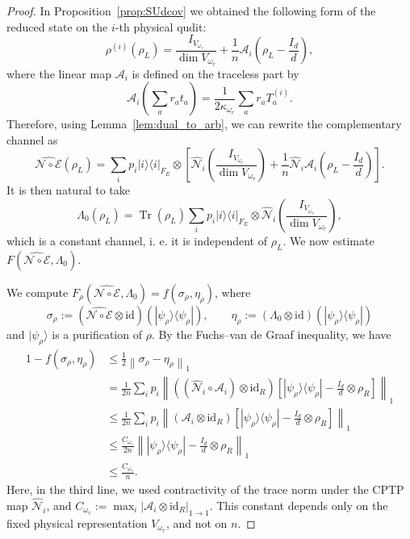 \documentclass[11pt,letterpaper]{article}
\theoremstyle{plain}
\theoremstyle{plain}
\theoremstyle{plain}
\theoremstyle{plain}
\theoremstyle{plain}
\theoremstyle{plain}
\theoremstyle{plain}
\theoremstyle{definition}
\theoremstyle{plain}
\begin{document}
\begin{proof}
In Proposition~\ref{prop:SUdcov} we obtained the following form of the reduced state on the \(i\)-th physical qudit:
\[
\rho^{(i)}(\rho_L)
=
\frac{I_{V_{\omega_r}}}{\dim V_{\omega_r}}
+
\frac{1}{n}\mathcal A_i\left(\rho_L-\frac{I_d}{d}\right),
\]
where the linear map \(\mathcal A_i\) is defined on the traceless part by
\[
\mathcal A_i\left(\sum_a r_a t_a\right)
=
\frac{1}{2\kappa_{\omega_r}}\sum_a r_a T_a^{(i)} .
\]
Therefore, using Lemma~\ref{lem:dual_to_arb}, we can rewrite the complementary channel as
\[
\widehat{\mathcal{N} \circ \mathcal{E}}(\rho_L)
=
\sum_i p_i |i\rangle\langle i|_{F_E}\otimes
\left[
\widehat{\mathcal N}_i\left(\frac{I_{V_{\omega_r}}}{\dim V_{\omega_r}}\right)
+
\frac{1}{n}
\widehat{\mathcal N}_i\mathcal A_i\left(\rho_L-\frac{I_d}{d}\right)
\right].
\]
It is then natural to take
\[
\Lambda_0(\rho_L)
=
\operatorname{Tr}(\rho_L)
\sum_i p_i |i\rangle\langle i|_{F_E}\otimes
\widehat{\mathcal N}_i\left(\frac{I_{V_{\omega_r}}}{\dim V_{\omega_r}}\right),
\]
which is a constant channel, i. e. it is independent of \(\rho_L\). We now estimate \(F(\widehat{\mathcal{N} \circ \mathcal{E}},\Lambda_0)\).

We compute \(F_\rho(\widehat{\mathcal{N} \circ \mathcal{E}},\Lambda_0)=f(\sigma_\rho,\eta_\rho)\), where
\[
\sigma_\rho
:=
(\widehat{\mathcal{N}\circ\mathcal{E}}\otimes \mathrm{id})
(|\psi_\rho\rangle\langle\psi_\rho|),
\qquad
\eta_\rho
:=
(\Lambda_0\otimes \mathrm{id})
(|\psi_\rho\rangle\langle\psi_\rho|)
\]
and \(|\psi_\rho\rangle\) is a purification of \(\rho\). By the Fuchs--van de Graaf inequality, we have
\[
\begin{aligned}
1-f(\sigma_\rho,\eta_\rho)
&\leq
\frac{1}{2}\left\|\sigma_\rho-\eta_\rho\right\|_1 \\
&=
\frac{1}{2n}
\sum_i p_i
\left\|
\left((\widehat{\mathcal N}_i\circ \mathcal A_i)\otimes \mathrm{id}_R\right)
\left[
|\psi_\rho\rangle\langle\psi_\rho|
-
\frac{I_d}{d}\otimes \rho_R
\right]
\right\|_1 \\
&\leq
\frac{1}{2n}
\sum_i p_i
\left\|
(\mathcal A_i\otimes \mathrm{id}_R)
\left[
|\psi_\rho\rangle\langle\psi_\rho|
-
\frac{I_d}{d}\otimes \rho_R
\right]
\right\|_1 \\
&\leq
\frac{C_{\omega_r}}{2n}
\left\|
|\psi_\rho\rangle\langle\psi_\rho|
-
\frac{I_d}{d}\otimes \rho_R
\right\|_1 \\
&\leq
\frac{C_{\omega_r}}{n}.
\end{aligned}
\]
Here, in the third line, we used contractivity of the trace norm under the CPTP map \(\widehat{\mathcal N}_i\), 
and \(C_{\omega_r}:=\max_i|\mathcal A_i\otimes \mathrm{id}_R|_{1\to 1}\). 
This constant depends only on the fixed physical representation \(V_{\omega_r}\), and not on \(n\).


\end{proof}
\end{document}

